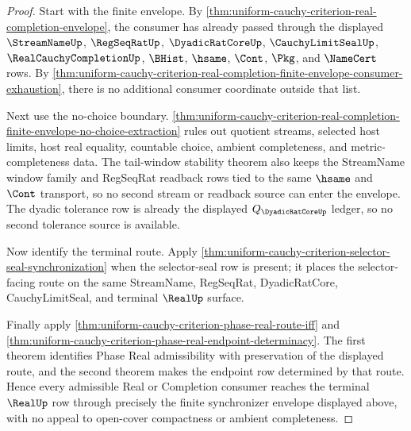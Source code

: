 \begin{proof}
Start with the finite envelope. By \autoref{thm:uniform-cauchy-criterion-real-completion-envelope}, the consumer has already passed through the displayed $\StreamNameUp$, $\RegSeqRatUp$, $\DyadicRatCoreUp$, $\CauchyLimitSealUp$, $\RealCauchyCompletionUp$, $\BHist$, $\hsame$, $\Cont$, $\Pkg$, and $\NameCert$ rows. By \autoref{thm:uniform-cauchy-criterion-real-completion-finite-envelope-consumer-exhaustion}, there is no additional consumer coordinate outside that list.

Next use the no-choice boundary. \autoref{thm:uniform-cauchy-criterion-real-completion-finite-envelope-no-choice-extraction} rules out quotient streams, selected host limits, host real equality, countable choice, ambient completeness, and metric-completeness data. The tail-window stability theorem also keeps the StreamName window family and RegSeqRat readback rows tied to the same $\hsame$ and $\Cont$ transport, so no second stream or readback source can enter the envelope. The dyadic tolerance row is already the displayed $Q_{\DyadicRatCoreUp}$ ledger, so no second tolerance source is available.

Now identify the terminal route. Apply \autoref{thm:uniform-cauchy-criterion-selector-seal-synchronization} when the selector-seal row is present; it places the selector-facing route on the same StreamName, RegSeqRat, DyadicRatCore, CauchyLimitSeal, and terminal $\RealUp$ surface.

Finally apply \autoref{thm:uniform-cauchy-criterion-phase-real-route-iff} and \autoref{thm:uniform-cauchy-criterion-phase-real-endpoint-determinacy}. The first theorem identifies Phase Real admissibility with preservation of the displayed route, and the second theorem makes the endpoint row determined by that route. Hence every admissible Real or Completion consumer reaches the terminal $\RealUp$ row through precisely the finite synchronizer envelope displayed above, with no appeal to open-cover compactness or ambient completeness.
\end{proof}

